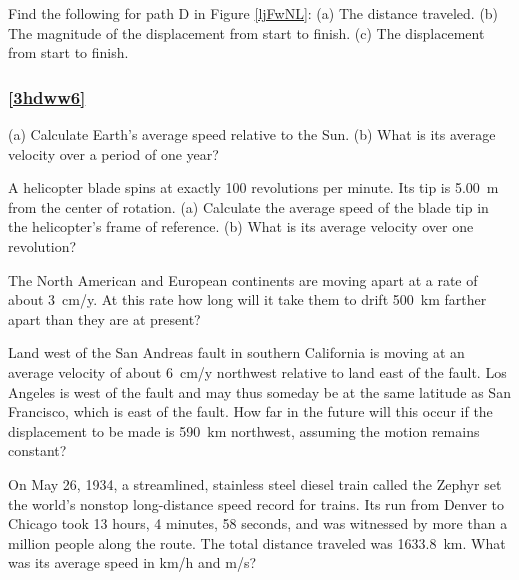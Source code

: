 \documentclass[main-ap-physics.tex]{subfiles}
\begin{document}
\begin{exercise}
    Find the following for path D in Figure \ref{ljFwNL}: (a) The distance traveled. (b) The magnitude of the displacement from start to finish. (c) The displacement from start to finish.
\end{exercise}

\subsubsection*{\ref{3hdww6} }

\begin{exercise}
    (a) Calculate Earth's average speed relative to the Sun. (b) What is its average velocity over a period of one year?
\end{exercise}

\begin{exercise}
    A helicopter blade spins at exactly 100 revolutions per minute. Its tip is \SI{5.00}{m} from the center of rotation. (a) Calculate the average speed of the blade tip in the helicopter’s frame of reference. (b) What is its average velocity over one revolution?
\end{exercise}

\begin{exercise}
    The North American and European continents are moving apart at a rate of about \SI{3}{cm/y}. At this rate how long will it take them to drift \SI{500}{km} farther apart than they are at present?
\end{exercise}

\begin{exercise}
    Land west of the San Andreas fault in southern California is moving at an average velocity of about \SI{6}{cm/y} northwest relative to land east of the fault. Los Angeles is west of the fault and may thus someday be at the same latitude as San Francisco, which is east of the fault. How far in the future will this occur if the displacement to be made is \SI{590}{km} northwest, assuming the motion remains constant?
\end{exercise}

\begin{exercise}
    On May 26, 1934, a streamlined, stainless steel diesel train called the Zephyr set the world’s nonstop long-distance speed record for trains. Its run from Denver to Chicago took 13 hours, 4 minutes, 58 seconds, and was witnessed by more than a million people along the route. The total distance traveled was \SI{1633.8}{km}. What was its average speed in km/h and m/s?
\end{exercise}
\end{document}
